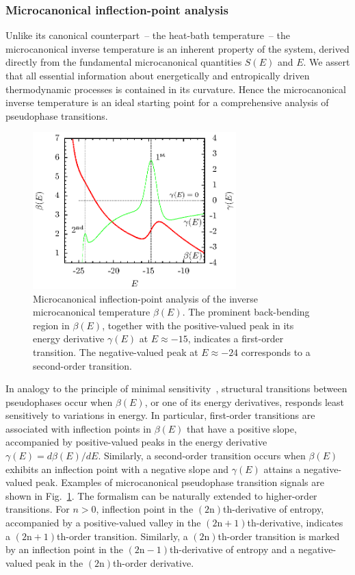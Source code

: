 \documentclass[12pt]{report}
\begin{document}
\subsubsection{Microcanonical inflection-point analysis}
\label{subsubsec:InflectionPointAnalysis}
Unlike its canonical counterpart~-- the heat-bath temperature~-- the
microcanonical inverse temperature is an inherent property of the system, derived directly from the fundamental microcanonical quantities $S(E)$ and $E$. We assert that all essential information about energetically and entropically driven thermodynamic processes is contained in its curvature. Hence the microcanonical inverse temperature is an ideal starting point for a comprehensive analysis of pseudophase transitions\cite{Gross2001}.  

%
\begin{figure}
\center
\includegraphics[width = 0.7\textwidth]{chapter2Figs/MicroAnalysisExample.eps}
\caption{\label{fig:Fig_1}%
Microcanonical inflection-point analysis of the inverse microcanonical temperature $\beta(E)$. The prominent back-bending region in $\beta(E)$, together with the positive-valued peak in its energy derivative $\gamma(E)$ at $E \approx -15$, indicates a first-order transition. The negative-valued peak at $E\approx -24$ corresponds to a second-order transition.}
\end{figure}
%

In analogy to the principle of minimal sensitivity~\cite{Stevenson}, structural transitions between pseudophases occur when 
$\beta(E)$, or one of its energy derivatives, responds least sensitively to variations in energy\cite{Schnabel2011}. In particular, first-order transitions are associated with inflection points in $\beta (E)$ that have a positive slope, accompanied by positive-valued peaks in the energy derivative $\gamma(E)=d\beta(E)/dE$. Similarly, a second-order transition occurs when $\beta(E)$ exhibits an inflection point with a negative slope and $\gamma(E)$ attains a negative-valued peak. Examples of microcanonical pseudophase transition signals are shown in Fig.~\ref{fig:Fig_1}. The formalism can be naturally extended to higher-order transitions. For $n > 0$, inflection point in the $(2\mathrm{n})$th-derivative of entropy, accompanied by a positive-valued valley in the $(2\mathrm{n}+1)$th-derivative, indicates a $(2\mathrm{n}+1)$th-order transition. Similarly, a $(2\mathrm{n})$th-order transition is marked by an inflection point in the $(2\mathrm{n}-1)$th-derivative of entropy and a negative-valued peak in the $(2\mathrm{n})$th-order derivative.
\end{document}
